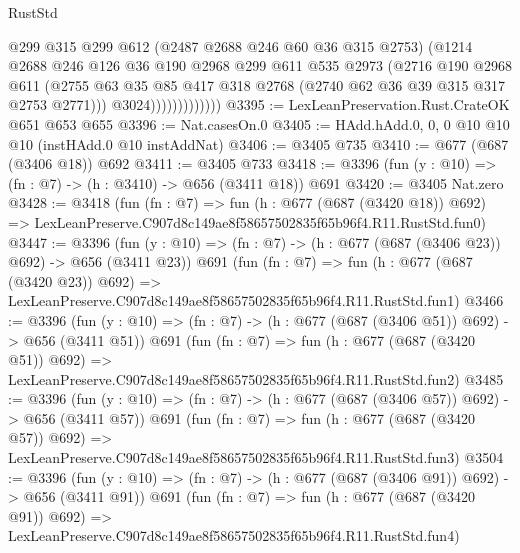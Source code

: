 \begin{lexlean}{RustStd}
\begin{coremodule}
                            @299
                            @315
                            @299
                            @612
                            (@2487 @2688 @246 @60 @36 @315 @2753)
                            (@1214
                              @2688
                              @246
                              @126
                              @36
                              @190
                              @2968
                              @299
                              @611
                              @535
                              @2973
                              (@2716
                                @190
                                @2968
                                @611
                                (@2755
                                  @63
                                  @35
                                  @85
                                  @417
                                  @318
                                  @2768
                                  (@2740 @62 @36 @39 @315 @317 @2753 @2771)))
                              @3024)))))))))))))
@3395 := LexLeanPreservation.Rust.CrateOK @651 @653 @655
@3396 := Nat.casesOn.{0}
@3405 := HAdd.hAdd.{0, 0, 0} @10 @10 @10 (instHAdd.{0} @10 instAddNat)
@3406 := @3405 @735
@3410 := @677 (@687 (@3406 @18)) @692
@3411 := @3405 @733
@3418 := @3396 (fun (y : @10) => (fn : @7) -> (h : @3410) -> @656 (@3411 @18)) @691
@3420 := @3405 Nat.zero
@3428 := @3418
    (fun (fn : @7) =>
    fun (h : @677 (@687 (@3420 @18)) @692) =>
    LexLeanPreserve.C907d8c149ae8f58657502835f65b96f4.R11.RustStd.fun0)
@3447 := @3396
    (fun (y : @10) => (fn : @7) -> (h : @677 (@687 (@3406 @23)) @692) -> @656 (@3411 @23))
    @691
    (fun (fn : @7) =>
    fun (h : @677 (@687 (@3420 @23)) @692) =>
    LexLeanPreserve.C907d8c149ae8f58657502835f65b96f4.R11.RustStd.fun1)
@3466 := @3396
    (fun (y : @10) => (fn : @7) -> (h : @677 (@687 (@3406 @51)) @692) -> @656 (@3411 @51))
    @691
    (fun (fn : @7) =>
    fun (h : @677 (@687 (@3420 @51)) @692) =>
    LexLeanPreserve.C907d8c149ae8f58657502835f65b96f4.R11.RustStd.fun2)
@3485 := @3396
    (fun (y : @10) => (fn : @7) -> (h : @677 (@687 (@3406 @57)) @692) -> @656 (@3411 @57))
    @691
    (fun (fn : @7) =>
    fun (h : @677 (@687 (@3420 @57)) @692) =>
    LexLeanPreserve.C907d8c149ae8f58657502835f65b96f4.R11.RustStd.fun3)
@3504 := @3396
    (fun (y : @10) => (fn : @7) -> (h : @677 (@687 (@3406 @91)) @692) -> @656 (@3411 @91))
    @691
    (fun (fn : @7) =>
    fun (h : @677 (@687 (@3420 @91)) @692) =>
    LexLeanPreserve.C907d8c149ae8f58657502835f65b96f4.R11.RustStd.fun4)

\end{coremodule}
\end{lexlean}
